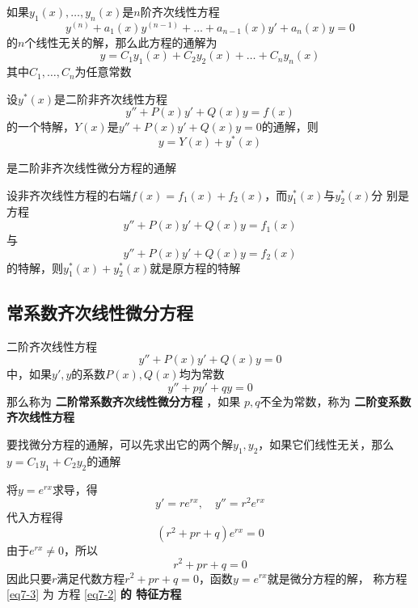 \documentclass[11pt]{article}
\begin{document}
\begin{corollary}[]
如果\(y_1(x),\dots,y_n(x)\)是\(n\)阶齐次线性方程
\begin{equation*}
y^{(n)}+a_1(x)y^{(n-1)}+\dots+a_{n-1}(x)y'+a_n(x)y=0
\end{equation*}
的\(n\)个线性无关的解，那么此方程的通解为
\begin{equation*}
y=C_1y_1(x)+C_2y_2(x)+\dots+C_ny_n(x)
\end{equation*}
其中\(C_1,\dots,C_n\)为任意常数
\end{corollary}

\begin{theorem}[]
设\(y^*(x)\)是二阶非齐次线性方程
\begin{equation*}
y''+P(x)y'+Q(x)y=f(x)
\end{equation*}
的一个特解，\(Y(x)\)是\(y''+P(x)y'+Q(x)y=0\)的通解，则
\begin{equation*}
y=Y(x)+y^*(x)
\end{equation*}


是二阶非齐次线性微分方程的通解
\end{theorem}

\begin{theorem}[叠加原理]
设非齐次线性方程的右端\(f(x)=f_1(x)+f_2(x)\)，而\(y_1^*(x)\)与\(y_2^*(x)\)分
别是方程
\begin{equation*}
y''+P(x)y'+Q(x)y=f_1(x)
\end{equation*}
与
\begin{equation*}
y''+P(x)y'+Q(x)y=f_2(x)
\end{equation*}
的特解，则\(y_1^*(x)+y_2^*(x)\)就是原方程的特解
\end{theorem}
\subsection{常系数齐次线性微分方程}
\label{sec:org700fb52}
二阶齐次线性方程
\begin{equation*}
y''+P(x)y'+Q(x)y=0
\end{equation*}
中，如果\(y',y\)的系数\(P(x),Q(x)\)均为常数
\begin{equation}
y''+py'+qy=0\label{eq7-2}
\end{equation}
那么称为 \textbf{二阶常系数齐次线性微分方程} ，如果 \(p,q\)不全为常数，称为 \textbf{二阶变系数
齐次线性方程}

要找微分方程的通解，可以先求出它的两个解\(y_1,y_2\)，如果它们线性无关，那么
\(y=C_1y_1+C_2y_2\)的通解

将\(y=e^{rx}\)求导，得
\begin{equation*}
y'=re^{rx},\quad y''=r^2e^{rx}
\end{equation*}
代入方程得
\begin{equation*}
(r^2+pr+q)e^{rx}=0
\end{equation*}
由于\(e^{rx}\neq0\)，所以
\begin{equation}
r^2+pr+q=0\label{eq7-3}
\end{equation}
因此只要\(r\)满足代数方程\(r^2+pr+q=0\)，函数\(y=e^{rx}\)就是微分方程的解，
称方程 \eqref{eq7-3}
为 方程 \eqref{eq7-2} \textbf{的 特征方程}
\end{document}
